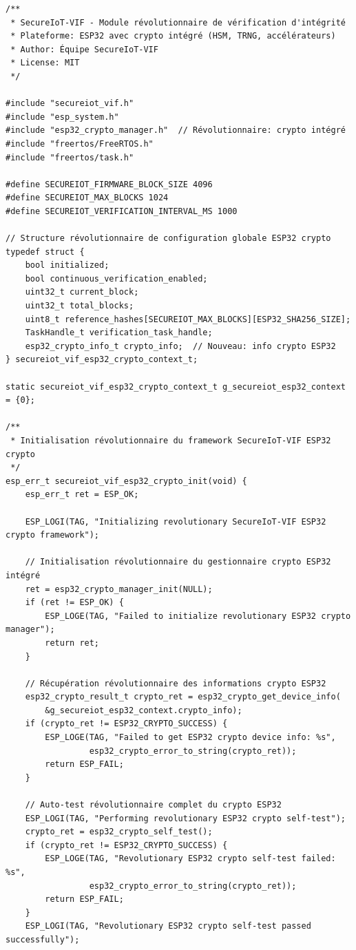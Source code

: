 \lstset{language=C}
\begin{lstlisting}[caption={Implémentation révolutionnaire complète du module de vérification d'intégrité ESP32 crypto intégré}]
/**
 * SecureIoT-VIF - Module révolutionnaire de vérification d'intégrité
 * Plateforme: ESP32 avec crypto intégré (HSM, TRNG, accélérateurs)
 * Author: Équipe SecureIoT-VIF
 * License: MIT
 */

#include "secureiot_vif.h"
#include "esp_system.h"
#include "esp32_crypto_manager.h"  // Révolutionnaire: crypto intégré
#include "freertos/FreeRTOS.h"
#include "freertos/task.h"

#define SECUREIOT_FIRMWARE_BLOCK_SIZE 4096
#define SECUREIOT_MAX_BLOCKS 1024
#define SECUREIOT_VERIFICATION_INTERVAL_MS 1000

// Structure révolutionnaire de configuration globale ESP32 crypto
typedef struct {
    bool initialized;
    bool continuous_verification_enabled;
    uint32_t current_block;
    uint32_t total_blocks;
    uint8_t reference_hashes[SECUREIOT_MAX_BLOCKS][ESP32_SHA256_SIZE];
    TaskHandle_t verification_task_handle;
    esp32_crypto_info_t crypto_info;  // Nouveau: info crypto ESP32
} secureiot_vif_esp32_crypto_context_t;

static secureiot_vif_esp32_crypto_context_t g_secureiot_esp32_context = {0};

/**
 * Initialisation révolutionnaire du framework SecureIoT-VIF ESP32 crypto
 */
esp_err_t secureiot_vif_esp32_crypto_init(void) {
    esp_err_t ret = ESP_OK;
    
    ESP_LOGI(TAG, "Initializing revolutionary SecureIoT-VIF ESP32 crypto framework");
    
    // Initialisation révolutionnaire du gestionnaire crypto ESP32 intégré
    ret = esp32_crypto_manager_init(NULL);
    if (ret != ESP_OK) {
        ESP_LOGE(TAG, "Failed to initialize revolutionary ESP32 crypto manager");
        return ret;
    }
    
    // Récupération révolutionnaire des informations crypto ESP32
    esp32_crypto_result_t crypto_ret = esp32_crypto_get_device_info(
        &g_secureiot_esp32_context.crypto_info);
    if (crypto_ret != ESP32_CRYPTO_SUCCESS) {
        ESP_LOGE(TAG, "Failed to get ESP32 crypto device info: %s", 
                 esp32_crypto_error_to_string(crypto_ret));
        return ESP_FAIL;
    }
    
    // Auto-test révolutionnaire complet du crypto ESP32
    ESP_LOGI(TAG, "Performing revolutionary ESP32 crypto self-test");
    crypto_ret = esp32_crypto_self_test();
    if (crypto_ret != ESP32_CRYPTO_SUCCESS) {
        ESP_LOGE(TAG, "Revolutionary ESP32 crypto self-test failed: %s", 
                 esp32_crypto_error_to_string(crypto_ret));
        return ESP_FAIL;
    }
    ESP_LOGI(TAG, "Revolutionary ESP32 crypto self-test passed successfully");
    

\end{lstlisting}
